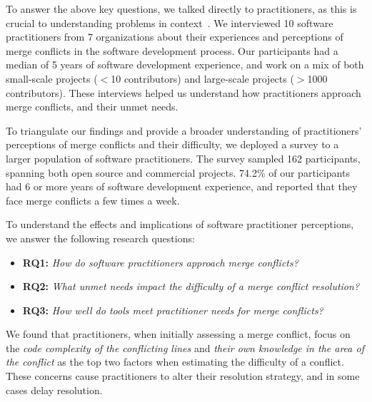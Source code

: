 To answer the above key questions, we talked directly to practitioners, as this is crucial to understanding problems in context~\cite{fritz2010using, sillito2006questions, de2008answering, ko2007information}.
We interviewed 10 software practitioners from 7 organizations about their experiences and perceptions of merge conflicts in the software development process.
Our participants had a median of 5 years of software development experience, and work on a mix of both small-scale projects ($<$10 contributors) and large-scale projects ($>$1000 contributors).
These interviews helped us understand how practitioners approach merge conflicts, and their unmet needs.

To triangulate our findings and provide a broader understanding of practitioners' perceptions of merge conflicts and their difficulty, we deployed a survey to a larger population of software practitioners.
The survey sampled 162 participants, spanning both open source and commercial projects. 74.2\% of our participants had 6 or more years of software development experience, and reported that they face merge conflicts a few times a week.

To understand the effects and implications of software practitioner perceptions, we answer the following research questions:

\begin{itemize}
\item \textbf{RQ1:} \textit{How do software practitioners approach merge conflicts?}
\item \textbf{RQ2:} \textit{What unmet needs impact the difficulty of a merge conflict resolution?}
\item \textbf{RQ3:} \textit{How well do tools meet practitioner needs for merge conflicts?}
\end{itemize}

We found that practitioners, when initially assessing a merge conflict, focus on the \textit{code complexity of the conflicting lines} and \textit{their own knowledge in the area of the conflict} as the top two factors when estimating the difficulty of a conflict. These concerns cause practitioners to alter their resolution strategy, and in some cases delay resolution.


